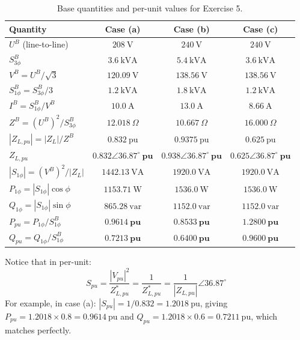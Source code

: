 \begin{table}[htbp]
    \centering
    \caption{Base quantities and per-unit values for Exercise 5.}
    \label{tab:tp2_pu}
    \renewcommand{\arraystretch}{1.3}
    \begin{tabular}{lccc}
        \toprule
        \textbf{Quantity} & \textbf{Case (a)} & \textbf{Case (b)} & \textbf{Case (c)} \\
        \midrule
        $U^B$ (line-to-line) & $208\ \text{V}$ & $240\ \text{V}$ & $240\ \text{V}$ \\
        $S_{3\phi}^B$ & $3.6\ \text{kVA}$ & $5.4\ \text{kVA}$ & $3.6\ \text{kVA}$ \\
        \midrule
        $V^B = U^B / \sqrt{3}$ & $120.09\ \text{V}$ & $138.56\ \text{V}$ & $138.56\ \text{V}$ \\
        $S_{1\phi}^B = S_{3\phi}^B / 3$ & $1.2\ \text{kVA}$ & $1.8\ \text{kVA}$ & $1.2\ \text{kVA}$ \\
        $I^B = S_{1\phi}^B / V^B$ & $10.0\ \text{A}$ & $13.0\ \text{A}$ & $8.66\ \text{A}$ \\
        $Z^B = (U^B)^2 / S_{3\phi}^B$ & $12.018\ \Omega$ & $10.667\ \Omega$ & $16.000\ \Omega$ \\
        \midrule
        $|Z_{L,pu}| = |Z_L| / Z^B$ & $0.832\ \text{pu}$ & $0.9375\ \text{pu}$ & $0.625\ \text{pu}$ \\
        $Z_{L,pu}$ & $\mathbf{0.832\angle 36.87^\circ\ \text{pu}}$ & $\mathbf{0.938\angle 36.87^\circ\ \text{pu}}$ & $\mathbf{0.625\angle 36.87^\circ\ \text{pu}}$ \\
        \midrule
        $|S_{1\phi}| = (V^B)^2 / |Z_L|$ & $1442.13\ \text{VA}$ & $1920.0\ \text{VA}$ & $1920.0\ \text{VA}$ \\
        $P_{1\phi} = |S_{1\phi}|\cos\phi$ & $1153.71\ \text{W}$ & $1536.0\ \text{W}$ & $1536.0\ \text{W}$ \\
        $Q_{1\phi} = |S_{1\phi}|\sin\phi$ & $865.28\ \text{var}$ & $1152.0\ \text{var}$ & $1152.0\ \text{var}$ \\
        \midrule
        $P_{pu} = P_{1\phi} / S_{1\phi}^B$ & $\mathbf{0.9614\ \text{pu}}$ & $\mathbf{0.8533\ \text{pu}}$ & $\mathbf{1.2800\ \text{pu}}$ \\
        $Q_{pu} = Q_{1\phi} / S_{1\phi}^B$ & $\mathbf{0.7213\ \text{pu}}$ & $\mathbf{0.6400\ \text{pu}}$ & $\mathbf{0.9600\ \text{pu}}$ \\
        \bottomrule
    \end{tabular}
\end{table}
Notice that in per-unit:
\[
S_{pu} = \frac{|V_{pu}|^2}{Z_{L,pu}^*} = \frac{1}{Z_{L,pu}^*} = \frac{1}{|Z_{L,pu}|} \angle 36.87^\circ
\]
For example, in case (a): $|S_{pu}| = 1 / 0.832 = 1.2018\ \text{pu}$, giving $P_{pu} = 1.2018 \times 0.8 = 0.9614\ \text{pu}$ and $Q_{pu} = 1.2018 \times 0.6 = 0.7211\ \text{pu}$, which matches perfectly.
